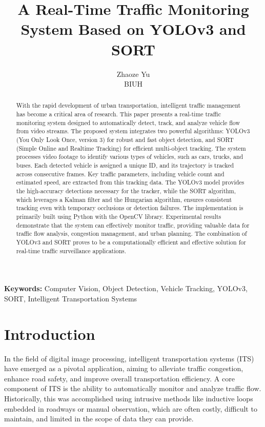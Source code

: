 \documentclass{article}
\title{A Real-Time Traffic Monitoring System Based on YOLOv3 and SORT}
\author{Zhaoze Yu \\ BIUH}
\date{}
\begin{document}
\maketitle

\begin{abstract}
With the rapid development of urban transportation, intelligent traffic management has become a critical area of research. This paper presents a real-time traffic monitoring system designed to automatically detect, track, and analyze vehicle flow from video streams. The proposed system integrates two powerful algorithms: YOLOv3 (You Only Look Once, version 3) for robust and fast object detection, and SORT (Simple Online and Realtime Tracking) for efficient multi-object tracking. The system processes video footage to identify various types of vehicles, such as cars, trucks, and buses. Each detected vehicle is assigned a unique ID, and its trajectory is tracked across consecutive frames. Key traffic parameters, including vehicle count and estimated speed, are extracted from this tracking data. The YOLOv3 model provides the high-accuracy detections necessary for the tracker, while the SORT algorithm, which leverages a Kalman filter and the Hungarian algorithm, ensures consistent tracking even with temporary occlusions or detection failures. The implementation is primarily built using Python with the OpenCV library. Experimental results demonstrate that the system can effectively monitor traffic, providing valuable data for traffic flow analysis, congestion management, and urban planning. The combination of YOLOv3 and SORT proves to be a computationally efficient and effective solution for real-time traffic surveillance applications.
\end{abstract}

\noindent
\textbf{Keywords:} Computer Vision, Object Detection, Vehicle Tracking, YOLOv3, SORT, Intelligent Transportation Systems

\section{Introduction}

In the field of digital image processing, intelligent transportation systems (ITS) have emerged as a pivotal application, aiming to alleviate traffic congestion, enhance road safety, and improve overall transportation efficiency. A core component of ITS is the ability to automatically monitor and analyze traffic flow. Historically, this was accomplished using intrusive methods like inductive loops embedded in roadways or manual observation, which are often costly, difficult to maintain, and limited in the scope of data they can provide.
\end{document}
